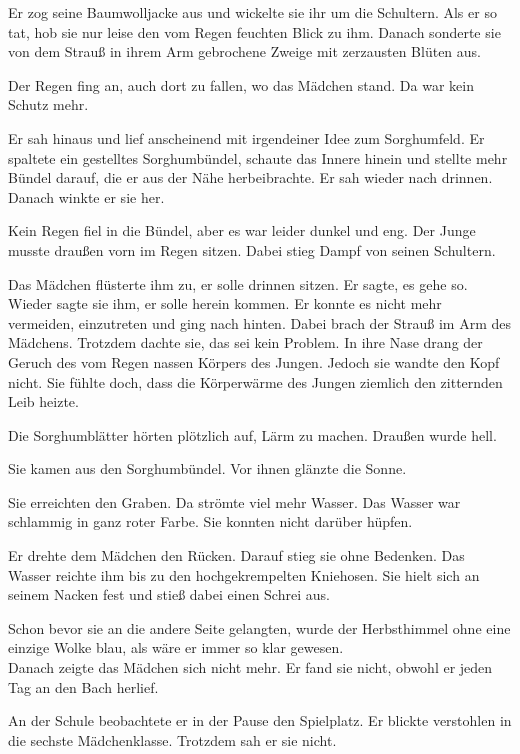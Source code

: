 \documentclass[prd,a4paper,12pt,tightenlines,notitlepage,nofootinbib]{revtex4-1}
\begin{document}
Er zog seine Baumwolljacke
aus und wickelte sie ihr um die Schultern.  Als er so tat, hob sie nur
leise den vom Regen feuchten Blick zu ihm.  Danach sonderte sie von dem
Strauß in ihrem Arm gebrochene Zweige mit zerzausten Blüten aus.

Der Regen fing an, auch dort zu fallen, wo das Mädchen stand.
Da war kein Schutz mehr.

Er sah hinaus und lief anscheinend mit irgendeiner Idee zum
Sorghumfeld.  Er spaltete ein gestelltes Sorghumbündel,
schaute das Innere hinein und stellte mehr
Bündel darauf, die er aus der Nähe herbeibrachte.  Er sah wieder nach drinnen.
Danach winkte er sie her.

Kein Regen fiel in die Bündel, aber es war
leider dunkel und eng.  Der Junge musste draußen vorn im Regen
sitzen.  Dabei stieg Dampf von seinen Schultern.

Das Mädchen
flüsterte ihm zu, er solle drinnen sitzen.  Er sagte, es gehe so.  Wieder
sagte sie ihm, er solle herein kommen.  Er konnte es nicht mehr vermeiden,
einzutreten und ging nach hinten.
Dabei brach der Strauß im Arm des
Mädchens.  Trotzdem dachte sie, das sei kein Problem.  In ihre Nase drang
der Geruch des vom Regen nassen Körpers des Jungen.  Jedoch sie wandte
den Kopf nicht.  Sie fühlte doch, dass die Körperwärme des Jungen
ziemlich den zitternden Leib heizte.

Die Sorghumblätter hörten
plötzlich auf, Lärm zu machen.  Draußen wurde hell.

Sie kamen aus
den Sorghumbündel.  Vor ihnen glänzte die Sonne.

Sie
erreichten den Graben.  Da strömte viel mehr Wasser.  Das Wasser war
schlammig in ganz roter Farbe.  Sie konnten nicht darüber hüpfen.

Er
drehte dem Mädchen den Rücken.  Darauf stieg sie ohne Bedenken.  Das
Wasser reichte ihm bis zu den hochgekrempelten Kniehosen.  Sie hielt
sich an seinem Nacken fest und stieß dabei einen Schrei aus.

Schon
bevor sie an die andere Seite gelangten, wurde der Herbsthimmel ohne
eine einzige Wolke blau, als wäre er immer so klar gewesen.
\\

Danach zeigte das Mädchen sich nicht mehr.
Er fand sie nicht, obwohl er jeden Tag an den Bach herlief.

An der Schule beobachtete er in der Pause den Spielplatz.
Er blickte verstohlen in die sechste Mädchenklasse.
Trotzdem sah er sie nicht.
\end{document}
